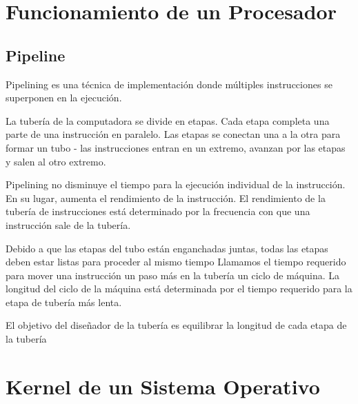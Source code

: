 \documentclass[12pt, fleqn]{report}                             %
\begin{document}
    \chapter{Funcionamiento de un Procesador}

        \clearpage
        \section{Pipeline}

            Pipelining es una técnica de implementación donde múltiples instrucciones se superponen en
            la ejecución.

            La tubería de la computadora se divide en etapas. Cada etapa completa una parte de una instrucción en paralelo. Las etapas se conectan una a la otra para formar un tubo - las instrucciones entran en un extremo, avanzan por las etapas y salen al otro extremo.

            Pipelining no disminuye el tiempo para la ejecución individual de la instrucción.
            En su lugar, aumenta el rendimiento de la instrucción.
            El rendimiento de la tubería de instrucciones está determinado por la frecuencia con que una
            instrucción sale de la tubería.

            Debido a que las etapas del tubo están enganchadas juntas, todas las etapas deben estar listas
            para proceder al mismo tiempo
            Llamamos el tiempo requerido para mover una instrucción un paso más en la tubería un ciclo de máquina.
            La longitud del ciclo de la máquina está determinada por el tiempo requerido para la etapa de tubería
            más lenta.

            El objetivo del diseñador de la tubería es equilibrar la longitud de cada etapa de la tubería





    \chapter{Kernel de un Sistema Operativo}
\end{document}
